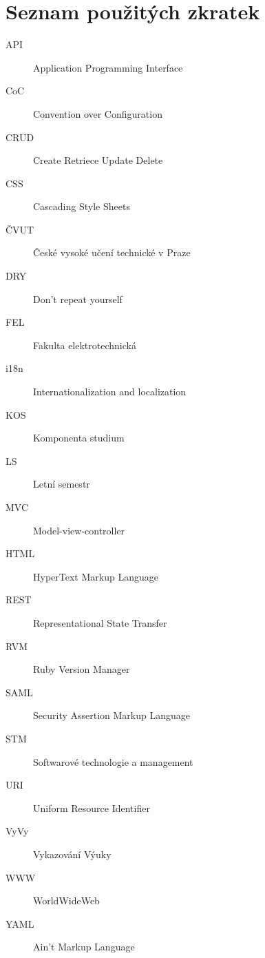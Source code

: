 \chapter{Seznam použitých zkratek}

\begin{description}
\item[API] Application Programming Interface
\item[CoC] Convention over Configuration
\item[CRUD] Create Retriece Update Delete
\item[CSS] Cascading Style Sheets
\item[ČVUT] České vysoké učení technické v Praze
\item[DRY] Don't repeat yourself
\item[FEL] Fakulta elektrotechnická
\item[i18n] Internationalization and localization
\item[KOS] Komponenta studium
\item[LS] Letní semestr
\item[MVC] Model-view-controller
\item[HTML] HyperText Markup Language
\item[REST] Representational State Transfer
\item[RVM] Ruby Version Manager
\item[SAML] Security Assertion Markup Language
\item[STM] Softwarové technologie a management
\item[URI] Uniform Resource Identifier
\item[VyVy] Vykazování Výuky
\item[WWW] WorldWideWeb
\item[YAML] Ain't Markup Language
\end{description}
